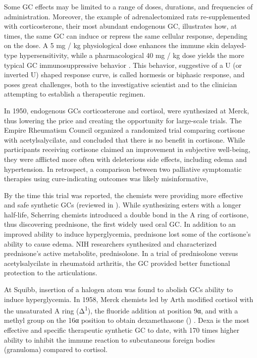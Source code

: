 \documentclass[12pt,english]{report}\usepackage[]{graphicx}\usepackage[]{color}
\begin{document}
Some GC effects may be limited to a range of doses, durations, and
frequencies of administration. Moreover, the example of adrenalectomized
rats re-supplemented with corticosterone, their most abundant endogenous
GC, illustrates how, at times, the same GC can induce or repress the
same cellular response, depending on the dose. A 5 mg / kg physiological
dose enhances the immune skin delayed-type hypersensitivity, while
a pharmacological 40 mg / kg dose yields the more typical GC immunosuppressive
behavior \citep{dhabhar1999enhancing}. This behavior, suggestive
of a U (or inverted U) shaped response curve, is called hormesis or
biphasic response, and poses great challenges, both to the investigative
scientist and to the clinician attempting to establish a therapeutic
regimen.

In 1950, endogenous GCs corticosterone and cortisol, were synthesized
at Merck\citep{wendler1950synthesis}, thus lowering the price and
creating the opportunity for large-scale trials. The Empire Rheumatism
Council organized a randomized trial comparing cortisone with acetylsalycilate,
and concluded that there is no benefit in cortisone\citep{theempirerheumatismcouncilsub-committee1957multi-centre}.
While participants receiving cortisone claimed an improvement in subjective
well-being, they were afflicted more often with deleterious side effects,
including edema and hypertension. In retrospect, a comparison between
two palliative symptomatic therapies using cure-indicating outcomes
was likely misinformative,

By the time this trial was reported, the chemists were providing more
effective and safe synthetic GCs (reviewed in \citep{sarett1959aspects}).
While synthesizing esters with a longer half-life, Scherring chemists
introduced a double bond in the A ring of cortisone, thus discovering
prednisone, the first widely used oral GC\citep{herzog195511-oxygenated}.
In addition to an improved ability to induce hyperglycemia, prednisone
lost some of the cortisone's ability to cause edema. NIH researchers
synthesized and characterized prednisone's active metabolite, prednisolone\citep{bunim1955metabolic}.
In a trial of prednisolone versus acetylsalycilate in rheumatoid arthritis,
the GC provided better functional protection to the articulations\citep{medicalresearchcouncil1960comparison}.

At Squibb, insertion of a halogen atom was found to abolish GCs ability
to induce hyperglycemia\citep{fried1955synthesis,fried1953synthesis}.
In 1958, Merck chemists led by Arth modified cortisol with the unsaturated
A ring (Δ\textsuperscript{1}), the fluoride addition at position
9α, and with a methyl group on the 16α position to obtain dexamethasone
() \citep{arth195816-methylated,arth195816-methylateda}.
Dexa is the most effective and specific therapeutic synthetic GC to
date, with 170 times higher ability to inhibit the immune reaction
to subcutaneous foreign bodies (granuloma) compared to cortisol.
\end{document}
